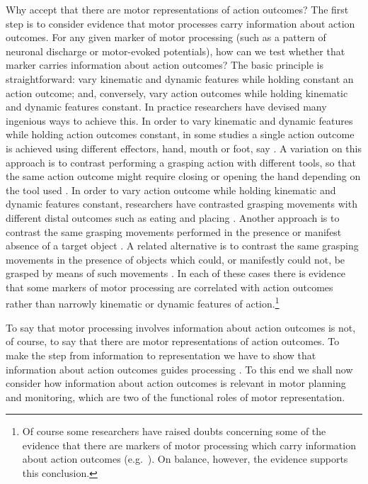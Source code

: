 \documentclass[12pt,\papersize]{extarticle}
\begin{document}
Why accept that there are motor representations of action outcomes? The first step is to consider evidence that motor processes carry information about action outcomes. For any given marker of motor processing (such as a pattern of neuronal discharge or motor-evoked potentials), how can we test whether that marker carries information about action outcomes? The basic principle is straightforward: vary kinematic and dynamic features while holding constant an action outcome; and, conversely, vary action outcomes while holding kinematic and dynamic features constant. In practice researchers have devised many ingenious ways to achieve this. In order to vary kinematic and dynamic features while holding action outcomes constant, in some studies a single action outcome is achieved using different effectors, hand, mouth or foot, say \citep{rizzolatti:1988_functional,Rizzolatti:2001ug,cattaneo:2010_state-dependent}. A variation on this approach is to contrast performing a grasping action with different tools, so that the same action outcome might require closing or opening the hand depending on the tool used \citep{umilta:2008pliers,cattaneo:2009_representation,rochat:2010_responses}. In order to vary action outcome while holding kinematic and dynamic features constant, researchers have contrasted grasping movements with different distal outcomes such as eating and placing \citep{Fogassi:2005nf,bonini:2010_ventral,cattaneo:2007_impairment}. Another approach is to contrast the same grasping movements performed in the presence or manifest absence of a target object \citep{Umilta:2001zr,villiger:2010_activity}. A related alternative is to contrast the same grasping movements in the presence of objects which could, or manifestly could not, be grasped by means of such movements \citep{koch:2010_resonance}. In each of these cases there is evidence that some markers of motor processing are correlated with action outcomes rather than narrowly kinematic or dynamic features of action.\footnote{ Of course some researchers have raised doubts concerning some of the evidence that there are markers of motor processing which carry information about action outcomes (e.g.\ \citealp{cavallo_grasping_2011,borroni_mirroring_2011}).  On balance, however, the evidence supports this conclusion.}

To say that motor processing involves information about action outcomes is not, of course, to say that there are motor representations of action outcomes.  To make the step from information to representation we have to show that information about action outcomes guides processing \citep[compare][]{Dretske:1988sq}. To this end we shall now consider how information about action outcomes is relevant in motor planning and monitoring, which are two of the functional roles of motor representation.  
\end{document}
